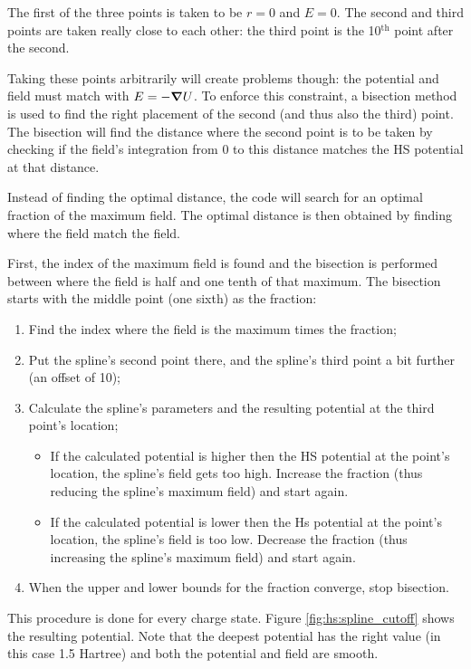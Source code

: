 \documentclass[12pt,letterpaper]{article}
\begin{document}
The first of the three points is taken to be $r=0$ and $E=0$. The second and third points are taken really close to each other: the third point is the 10$^{\textrm{th}}$ point after the second.

Taking these points arbitrarily will create problems though: the potential and field must match with $E = -\bm{\nabla} U$. To enforce this constraint, a bisection method is used to find the right placement of the second (and thus also the third) point. The bisection will find the distance where the second point is to be taken by checking if the field's integration from 0 to this distance matches the HS potential at that distance.

Instead of finding the optimal distance, the code will search for an optimal fraction of the maximum field. The optimal distance is then obtained by finding where the field match the field.

First, the index of the maximum field is found and the bisection is performed between where the field is half and one tenth of that maximum. The bisection starts with the middle point (one sixth) as the fraction:
\begin{enumerate}
\item Find the index where the field is the maximum times the fraction;
\item Put the spline's second point there, and the spline's third point a bit further (an offset of 10);
\item Calculate the spline's parameters and the resulting potential at the third point's location;
\begin{itemize}
\item If the calculated potential is higher then the HS potential at the point's location, the spline's field gets too high. Increase the fraction (thus reducing the spline's maximum field) and start again.
\item If the calculated potential is lower then the Hs potential at the point's location, the spline's field is too low. Decrease the fraction (thus increasing the spline's maximum field) and start again.
\end{itemize}
\item When the upper and lower bounds for the fraction converge, stop bisection.
\end{enumerate}

This procedure is done for every charge state. Figure \ref{fig:hs:spline_cutoff} shows the resulting potential. Note that the deepest potential has the right value (in this case 1.5 Hartree) and both the potential and field are smooth.
\end{document}
